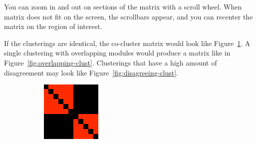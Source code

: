 You can zoom in and out on sections of the matrix with a scroll wheel. When 
matrix does not fit on the screen, the scrollbars appear, and you can recenter 
the matrix on the region of interest.

If the clusterings are identical, the co-cluster matrix would look like 
Figure~\ref{fig:identical-clust}. A single clustering with overlapping modules
would produce a matrix like in Figure~\ref{fig:overlapping-clust}. Clusterings
that have a high amount of disagreement may look like Figure~\ref{fig:disagreeing-clust}.


\begin{figure}[ht]
  \centering
  \begin{subfigure}[b]{0.1\textwidth}
    \centering
    \includegraphics[width=\textwidth]{identical-clust}
    \caption{}
    \label{fig:identical-clust}
  \end{subfigure}
  \begin{subfigure}[b]{0.1\textwidth}
    \centering

\end{subfigure}
\end{figure}
